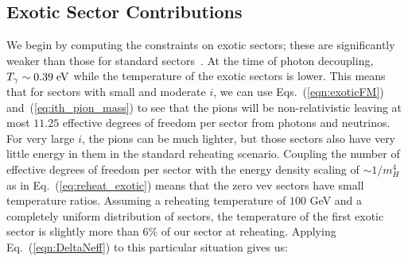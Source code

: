\documentclass[nofootinbib,twocolumn,preprintnumbers]{revtex4-1}
\begin{document}
\subsection{Exotic Sector Contributions}
We begin by computing the constraints on exotic sectors; these are significantly weaker than those for standard sectors~\cite{Arkani-Hamed:2016rle}. 
At the time of photon decoupling, $T_\gamma \sim 0.39 \;{\rm eV}$ while the temperature of the exotic sectors is lower. This means that for sectors with small and moderate $i$, we can use Eqs.~(\ref{eqn:exoticFM}) and~(\ref{eq:ith_pion_mass}) to see that the pions will be non-relativistic  leaving at most $11.25$ effective degrees of freedom per sector from photons and neutrinos.  For very large $i$, the pions can be much lighter, but those sectors also have very little energy in them in the standard reheating scenario. 
Coupling the number of effective degrees of freedom per sector with the energy density scaling of $\sim 1/m_H^4$ as in Eq.~(\ref{eq:reheat_exotic}) means that the zero vev sectors have small temperature ratios. Assuming a reheating temperature of $100$ GeV and a completely uniform distribution of sectors, the temperature of the first exotic sector is slightly more than $6\%$ of our sector at reheating. Applying Eq.~(\ref{eqn:DeltaNeff}) to this particular situation gives us:
\end{document}
